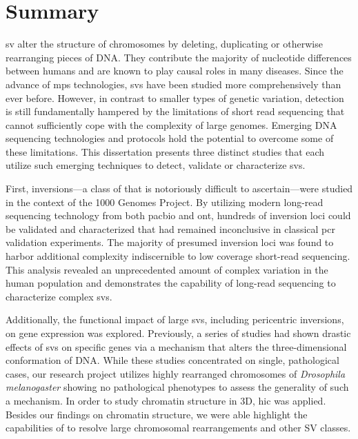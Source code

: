 \cleardoublepage
{}
\chapter*{Summary}

\Acf{sv} alter the structure of chromosomes by deleting, duplicating or
otherwise rearranging pieces of DNA. They contribute the majority of nucleotide
differences between humans and are known to play causal roles in many diseases.
Since the advance of \acf{mps} technologies, \acp{sv} have been
studied more comprehensively than ever before. However, in contrast to smaller
types of genetic variation, \sv detection is still fundamentally hampered by
the limitations of short read sequencing that cannot sufficiently cope with the
complexity of large genomes. Emerging DNA sequencing technologies and protocols
hold the potential to overcome some of these limitations. This dissertation
presents three distinct studies that each utilize such emerging techniques to
detect, validate or characterize \acp{sv}.

First, inversions---a class of \sv that is notoriously difficult to
ascertain---were studied in the context of the 1000 Genomes Project. By utilizing
modern long-read sequencing technology from both \acl{pacbio} and \acl{ont},
hundreds of inversion loci could be validated and characterized that had remained
inconclusive in classical \acs{pcr} validation experiments. The majority of presumed
inversion loci was found to harbor additional complexity indiscernible to low
coverage short-read sequencing. This analysis revealed an unprecedented amount of
complex variation in the human population and demonstrates the capability of
long-read sequencing to characterize complex \acp{sv}.

Additionally, the functional impact of large \acp{sv}, including
pericentric inversions, on gene expression was explored. Previously, a series of studies had
shown drastic effects of \acp{sv} on specific genes via a mechanism that alters
the three-dimensional conformation of DNA. While these studies concentrated on
single, pathological cases, our research project utilizes highly rearranged
chromosomes of \textit{Drosophila melanogaster} showing no pathological
phenotypes to assess the generality of such a mechanism. In order to study
chromatin structure in 3D, \acf{hic} was applied. Besides our findings on
chromatin structure, we were able highlight the capabilities of \hic to resolve
large chromosomal rearrangements and other SV classes.

